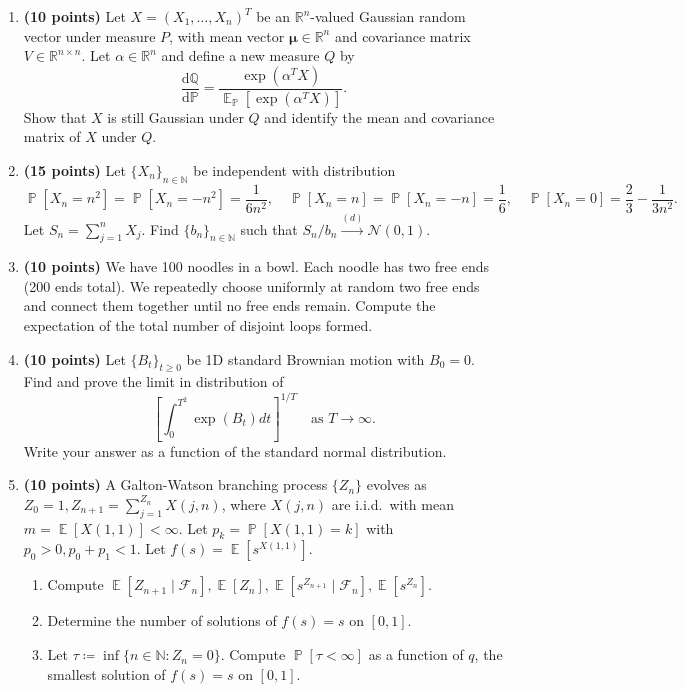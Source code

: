 \documentclass[11pt,a4paper]{article}
\DeclareMathOperator{\E}{\mathbb{E}}
\DeclareMathOperator{\Pbb}{\mathbb{P}}
\begin{document}
\begin{enumerate}[label=\textbf{\arabic*.}]
    \item \textbf{(10 points)} Let $X = (X_1, \dots, X_n)^T$ be an $\mathbb{R}^n$-valued Gaussian random vector under measure $P$, with mean vector $\bm{\mu} \in \mathbb{R}^n$ and covariance matrix $V \in \mathbb{R}^{n \times n}$. Let $\alpha \in \mathbb{R}^n$ and define a new measure $Q$ by
    \[
    \frac{\mathrm{d}\mathbb{Q}}{\mathrm{d}\mathbb{P}} = \frac{\exp(\alpha^T X)}{\E_{\mathbb{P}}[\exp(\alpha^T X)]}.
    \]
    Show that $X$ is still Gaussian under $Q$ and identify the mean and covariance matrix of $X$ under $Q$.

    \item \textbf{(15 points)} Let $\{X_n\}_{n \in \mathbb{N}}$ be independent with distribution
    \[
    \Pbb[X_n = n^2] = \Pbb[X_n = -n^2] = \frac{1}{6n^2}, \quad \Pbb[X_n = n] = \Pbb[X_n = -n] = \frac{1}{6}, \quad \Pbb[X_n = 0] = \frac{2}{3} - \frac{1}{3n^2}.
    \]
    Let $S_n = \sum_{j=1}^n X_j$. Find $\{b_n\}_{n \in \mathbb{N}}$ such that $S_n / b_n \xrightarrow{(d)} \mathcal{N}(0, 1)$.

    \item \textbf{(10 points)} We have 100 noodles in a bowl. Each noodle has two free ends (200 ends total). We repeatedly choose uniformly at random two free ends and connect them together until no free ends remain. Compute the expectation of the total number of disjoint loops formed.

    \item \textbf{(10 points)} Let $\{B_t\}_{t \ge 0}$ be 1D standard Brownian motion with $B_0 = 0$. Find and prove the limit in distribution of
    \[
    \left[ \int_0^{T^2} \exp(B_t) dt \right]^{1/T} \quad \text{as } T \to \infty.
    \]
    Write your answer as a function of the standard normal distribution.

    \item \textbf{(10 points)} A Galton-Watson branching process $\{Z_n\}$ evolves as $Z_0 = 1, Z_{n+1} = \sum_{j=1}^{Z_n} X(j, n)$, where $X(j, n)$ are i.i.d.\ with mean $m = \E[X(1, 1)] < \infty$. Let $p_k = \Pbb[X(1, 1) = k]$ with $p_0 > 0, p_0 + p_1 < 1$. Let $f(s) = \E[s^{X(1, 1)}]$.
    \begin{enumerate}[label=(\alph*)]
        \item Compute $\E[Z_{n+1} \mid \mathcal{F}_n], \E[Z_n], \E[s^{Z_{n+1}} \mid \mathcal{F}_n], \E[s^{Z_n}]$.
        \item Determine the number of solutions of $f(s) = s$ on $[0, 1]$.
        \item Let $\tau \coloneqq \inf\{n \in \mathbb{N} : Z_n = 0\}$. Compute $\Pbb[\tau < \infty]$ as a function of $q$, the smallest solution of $f(s) = s$ on $[0, 1]$.
    \end{enumerate}


\end{enumerate}
\end{document}
